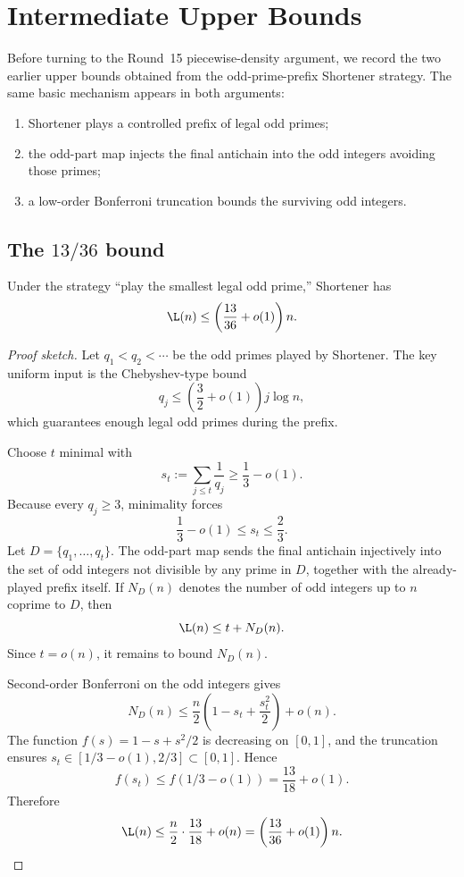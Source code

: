 
\section{Intermediate Upper Bounds}\label{sec:intermediate-upper}

Before turning to the Round~15 piecewise-density argument, we record the two
earlier upper bounds obtained from the odd-prime-prefix Shortener strategy.  The
same basic mechanism appears in both arguments:
\begin{enumerate}
  \item Shortener plays a controlled prefix of legal odd primes;
  \item the odd-part map injects the final antichain into the odd integers
    avoiding those primes;
  \item a low-order Bonferroni truncation bounds the surviving odd integers.
\end{enumerate}

\subsection{The \texorpdfstring{$13/36$}{13/36} bound}

\begin{theorem}\label{thm:1336}
Under the strategy ``play the smallest legal odd prime,'' Shortener has
\[
  \L(n) \le \left(\frac{13}{36}+o(1)\right)n.
\]
\end{theorem}

\begin{proof}[Proof sketch]
Let $q_1<q_2<\cdots$ be the odd primes played by Shortener.  The key uniform
input is the Chebyshev-type bound
\[
  q_j \le \left(\frac32+o(1)\right)j\log n,
\]
which guarantees enough legal odd primes during the prefix.

Choose $t$ minimal with
\[
  s_t := \sum_{j\le t}\frac1{q_j} \ge \frac13-o(1).
\]
Because every $q_j \ge 3$, minimality forces
\[
  \frac13-o(1) \le s_t \le \frac23.
\]
Let $D=\{q_1,\dots,q_t\}$.  The odd-part map sends the final antichain
injectively into the set of odd integers not divisible by any prime in $D$,
together with the already-played prefix itself.  If $N_D(n)$ denotes the number
of odd integers up to $n$ coprime to $D$, then
\[
  \L(n) \le t + N_D(n).
\]
Since $t=o(n)$, it remains to bound $N_D(n)$.

Second-order Bonferroni on the odd integers gives
\[
  N_D(n)
  \le
  \frac n2
  \left(1-s_t+\frac{s_t^2}{2}\right)
  + o(n).
\]
The function $f(s)=1-s+s^2/2$ is decreasing on $[0,1]$, and the truncation
ensures $s_t \in [1/3-o(1),2/3] \subset [0,1]$.  Hence
\[
  f(s_t) \le f(1/3-o(1)) = \frac{13}{18}+o(1).
\]
Therefore
\[
  \L(n) \le \frac n2 \cdot \frac{13}{18} + o(n)
  = \left(\frac{13}{36}+o(1)\right)n.
\]
\end{proof}

